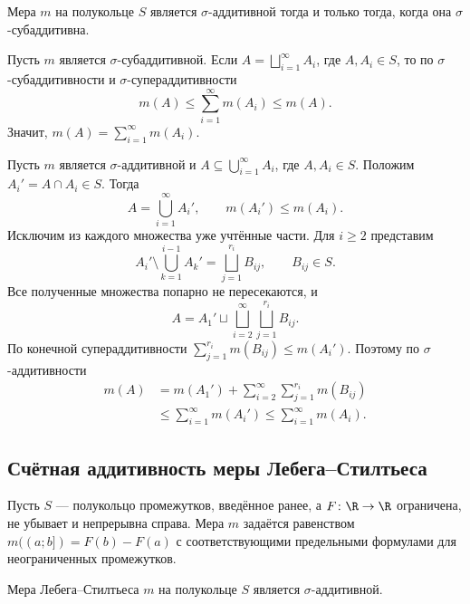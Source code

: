 \begin{theorem}
    Мера $m$ на полукольце $S$ является $\sigma$-аддитивной
    тогда и только тогда, когда она $\sigma$-субаддитивна.
\end{theorem}

\begin{Proof}[Достаточность]
    Пусть $m$ является $\sigma$-субаддитивной. Если
    $A=\bigsqcup_{i=1}^{\infty}A_i$, где $A,A_i\in S$, то
    по $\sigma$-субаддитивности и $\sigma$-супераддитивности
    \[
        m(A)\leq\sum_{i=1}^{\infty}m(A_i)\leq m(A).
    \]
    Значит, $m(A)=\sum_{i=1}^{\infty}m(A_i)$.
\end{Proof}

\begin{Proof}[Необходимость]
    Пусть $m$ является $\sigma$-аддитивной и
    $A\subseteq\bigcup_{i=1}^{\infty}A_i$, где $A,A_i\in S$.
    Положим $A_i'=A\cap A_i\in S$. Тогда
    \[
        A=\bigcup_{i=1}^{\infty}A_i',\qquad m(A_i')\leq m(A_i).
    \]
    Исключим из каждого множества уже учтённые части. Для $i\geq2$
    представим
    \[
        A_i'\setminus\bigcup_{k=1}^{i-1}A_k'
        =\bigsqcup_{j=1}^{r_i}B_{ij},\qquad B_{ij}\in S.
    \]
    Все полученные множества попарно не пересекаются, и
    \[
        A=A_1'\sqcup\bigsqcup_{i=2}^{\infty}
                       \bigsqcup_{j=1}^{r_i}B_{ij}.
    \]
    По конечной супераддитивности
    $\sum_{j=1}^{r_i}m(B_{ij})\leq m(A_i')$.
    Поэтому по $\sigma$-аддитивности
    \[
        \begin{aligned}
            m(A)
            &=m(A_1')+\sum_{i=2}^{\infty}\sum_{j=1}^{r_i}m(B_{ij})\\
            &\leq\sum_{i=1}^{\infty}m(A_i')
             \leq\sum_{i=1}^{\infty}m(A_i).
        \end{aligned}
    \]
\end{Proof}

\newpage
\subsection{Счётная аддитивность меры Лебега--Стилтьеса}

Пусть $S$ --- полукольцо промежутков, введённое ранее, а
$F\colon\R\to\R$ ограничена, не убывает и непрерывна справа.
Мера $m$ задаётся равенством $m((a;b])=F(b)-F(a)$
с соответствующими предельными формулами для неограниченных промежутков.

\begin{theorem}
    Мера Лебега--Стилтьеса $m$ на полукольце $S$ является
    $\sigma$-аддитивной.
\end{theorem}


